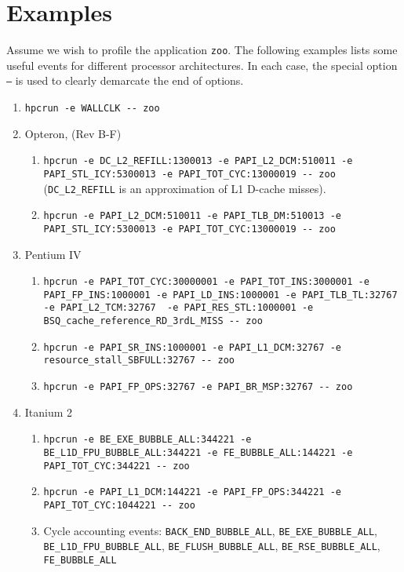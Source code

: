 \documentclass[english]{article}
\begin{document}
\section{Examples}

Assume we wish to profile the application \texttt{zoo}.
The following examples lists some useful events for different processor architectures.
In each case, the special option \texttt{--} is used to clearly demarcate the end of  options.

\begin{enumerate}
\item \verb+hpcrun -e WALLCLK -- zoo+
\item Opteron, (Rev B-F)
  \begin{enumerate}
    \item \verb+hpcrun -e DC_L2_REFILL:1300013 -e PAPI_L2_DCM:510011 -e PAPI_STL_ICY:5300013 -e PAPI_TOT_CYC:13000019 -- zoo+ (\verb+DC_L2_REFILL+ is an approximation of L1 D-cache misses).
    \item \verb+hpcrun -e PAPI_L2_DCM:510011 -e PAPI_TLB_DM:510013 -e PAPI_STL_ICY:5300013 -e PAPI_TOT_CYC:13000019 -- zoo+
  \end{enumerate}

\item Pentium IV 
  \begin{enumerate}
    \item \verb+hpcrun -e PAPI_TOT_CYC:30000001 -e PAPI_TOT_INS:3000001 -e PAPI_FP_INS:1000001 -e PAPI_LD_INS:1000001 -e PAPI_TLB_TL:32767  -e PAPI_L2_TCM:32767  -e PAPI_RES_STL:1000001 -e BSQ_cache_reference_RD_3rdL_MISS -- zoo+
    \item \verb+hpcrun -e PAPI_SR_INS:1000001 -e PAPI_L1_DCM:32767 -e resource_stall_SBFULL:32767 -- zoo+
    \item \verb+hpcrun -e PAPI_FP_OPS:32767 -e PAPI_BR_MSP:32767 -- zoo+
  \end{enumerate}

\item Itanium 2
  \begin{enumerate}
    \item \verb+hpcrun -e BE_EXE_BUBBLE_ALL:344221 -e BE_L1D_FPU_BUBBLE_ALL:344221 -e FE_BUBBLE_ALL:144221 -e PAPI_TOT_CYC:344221 -- zoo+
    \item \verb+hpcrun -e PAPI_L1_DCM:144221 -e PAPI_FP_OPS:344221 -e PAPI_TOT_CYC:1044221 -- zoo+
    \item Cycle accounting events: \verb+BACK_END_BUBBLE_ALL+, \verb+BE_EXE_BUBBLE_ALL+, \verb+BE_L1D_FPU_BUBBLE_ALL+, \verb+BE_FLUSH_BUBBLE_ALL+, \verb+BE_RSE_BUBBLE_ALL+, \verb+FE_BUBBLE_ALL+
  \end{enumerate}

\end{enumerate}
\end{document}
